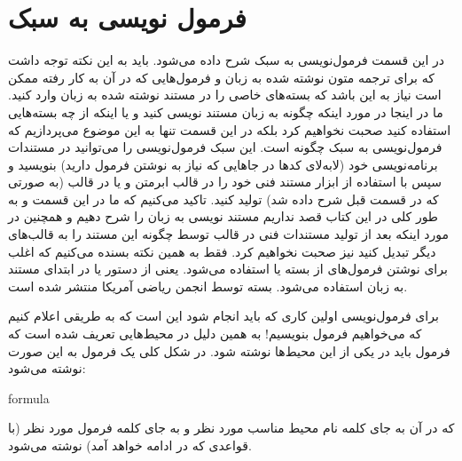 \section{فرمول نویسی به سبک \lr{\LaTeX}}
\label{sec:latex-formula}
در این قسمت فرمول‌نویسی به سبک \lr{\LaTeX} شرح داده می‌شود. باید به این نکته
توجه داشت که برای ترجمه متون نوشته شده به زبان \lr{\LaTeX} و فرمول‌هایی که در آن
به کار رفته ممکن است نیاز به این باشد که بسته‌های خاصی را در مستند نوشته شده به
زبان \lr{\LaTeX} وارد کنید. ما در اینجا در مورد اینکه چگونه به زبان \lr{\LaTeX}
مستند نویسی کنید و یا اینکه از چه بسته‌هایی استفاده کنید صحبت نخواهیم کرد بلکه
در این قسمت تنها به این موضوع می‌پردازیم که فرمول‌نویسی به سبک \lr{\LaTeX} چگونه
است. این سبک فرمول‌نویسی را می‌توانید در مستندات برنامه‌نویسی خود (لابه‌لای
کدها در جاهایی که نیاز به نوشتن فرمول دارید) بنویسید و سپس با استفاده از ابزار
 مستند فنی خود را در قالب ابرمتن و یا در قالب \lr{\LaTeX} (به صورتی
که در قسمت قبل شرح داده شد) تولید کنید. تاکید می‌کنیم که ما در این قسمت و به طور
کلی در این کتاب قصد نداریم مستند نویسی به زبان \lr{\LaTeX} را شرح دهیم و همچنین
در مورد اینکه بعد از تولید مستندات فنی در قالب \lr{\LaTeX} توسط 
چگونه این مستند را به قالب‌های دیگر تبدیل کنید نیز صحبت نخواهیم کرد. فقط به همین
نکته بسنده می‌کنیم که اغلب برای نوشتن فرمول‌های \lr{\LaTeX} از بسته
  یا  استفاده می‌شود. یعنی از دستور  یا  در ابتدای مستند به زبان \lr{\LaTeX} استفاده می‌شود. بسته
 توسط انجمن ریاضی آمریکا منتشر شده است.

برای فرمول‌نویسی اولین کاری که باید انجام شود این است که به طریقی اعلام کنیم که
می‌خواهیم فرمول بنویسیم! به همین دلیل در \lr{\LaTeX} محیط‌هایی تعریف شده است که
فرمول باید در یکی از این محیط‌ها نوشته شود. در شکل کلی یک فرمول به این صورت
نوشته می‌شود:

\begin{latex}
\begin{environment}
formula
\end{environment}
\end{latex}

که در آن به جای کلمه  نام محیط مناسب مورد نظر و به جای کلمه
 فرمول مورد نظر (با قواعدی که در ادامه خواهد آمد) نوشته می‌شود.

